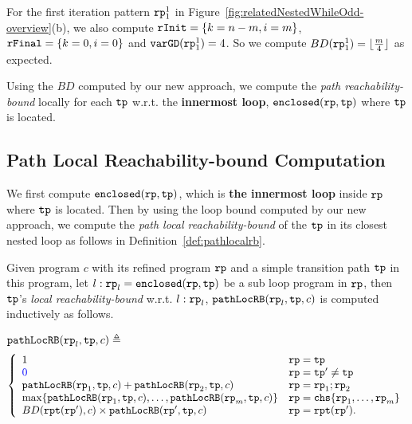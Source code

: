 For the first iteration pattern $\mathtt{rp}_1^1$ in Figure~\ref{fig:relatedNestedWhileOdd-overview}(b), we also compute 
$\mathtt{rInit} = \{k = n - m, i = m\}$, $\mathtt{rFinal} = \{k = 0, i = 0\}$ and $\mathtt{varGD}(\mathtt{rp}_1^1) = 4$. So we compute $BD(\mathtt{rp}_1^1) = \lfloor \frac{m}{4} \rfloor $ as expected.

Using the $BD$ computed by our new approach, we compute the \emph{path reachability-bound} locally for
each $\mathtt{tp}$ w.r.t. the \textbf{innermost loop}, $\mathtt{enclosed}(\mathtt{rp}, \mathtt{tp})$ where $\mathtt{tp}$ is located.

\subsection{Path Local Reachability-bound Computation}
We first compute $\mathtt{enclosed}(\mathtt{rp}, \mathtt{tp})$, which is \textbf{the innermost loop} inside $\mathtt{rp}$ where $\mathtt{tp}$ is located. Then by using the loop bound computed by our new approach, we compute the \emph{path local reachability-bound} of
the $\mathtt{tp}$ in its closest nested loop as follows in Definition~\ref{def:pathlocalrb}.
\begin{defn}
    \label{def:pathlocalrb}
    Given program $c$ with its refined program $\mathtt{rp}$ and a simple transition path $\mathtt{tp}$ in this program, 
    let $l: \mathtt{rp}_l = \mathtt{enclosed}(\mathtt{rp}, \mathtt{tp})$ be a sub loop program in $\mathtt{rp}$,
    then $\mathtt{tp}$'s \emph{local reachability-bound} w.r.t. $l: \mathtt{rp}_l$,
    $\mathtt{pathLocRB}(\mathtt{rp}_l, \mathtt{tp}, c)$
    is computed inductively as follows.

    $\mathtt{pathLocRB}(\mathtt{rp}_l, \mathtt{tp}, c) \triangleq$
    \[ 
      \left\{
    \begin{array}{ll}
       1  & \rprog = \tpath\\
      \highlight{0} & \rprog = \tpath' \neq \tpath\\
      \outinB(\rprog_1, \tpath, c) + \outinB(\rprog_2, \tpath, c) & \rprog = \rprog_1;\rprog_2 \\
      \max\left\{ \outinB(\rprog_1, \tpath, c), \ldots, \outinB(\rprog_m, \tpath, c) \right\} 
      & \rprog = \rpchoose{\rprog_1, \ldots, \rprog_m } \\
      BD(\rprepeat(\rprog'), c) \times \outinB(\rprog', \tpath, c) & \rprog = \rprepeat(\rprog').
    \end{array}
    \right.
    \]
\end{defn}
